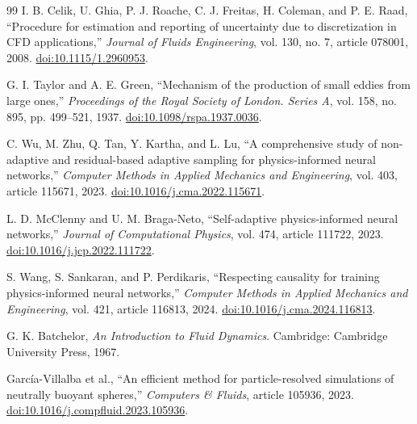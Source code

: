\begin{thebibliography}{99}
I. B. Celik, U. Ghia, P. J. Roache, C. J. Freitas, H. Coleman, and
P. E. Raad, ``Procedure for estimation and reporting of uncertainty due
to discretization in CFD applications,'' \emph{Journal of Fluids
Engineering}, vol. 130, no. 7, article 078001, 2008.
\href{https://doi.org/10.1115/1.2960953}{doi:10.1115/1.2960953}.

G. I. Taylor and A. E. Green, ``Mechanism of the production of small
eddies from large ones,'' \emph{Proceedings of the Royal Society of
London. Series A}, vol. 158, no. 895, pp. 499--521, 1937.
\href{https://doi.org/10.1098/rspa.1937.0036}{doi:10.1098/rspa.1937.0036}.

C. Wu, M. Zhu, Q. Tan, Y. Kartha, and L. Lu, ``A comprehensive study of
non-adaptive and residual-based adaptive sampling for physics-informed
neural networks,'' \emph{Computer Methods in Applied Mechanics and
Engineering}, vol. 403, article 115671, 2023.
\href{https://doi.org/10.1016/j.cma.2022.115671}{doi:10.1016/j.cma.2022.115671}.

L. D. McClenny and U. M. Braga-Neto, ``Self-adaptive physics-informed
neural networks,'' \emph{Journal of Computational Physics}, vol. 474,
article 111722, 2023.
\href{https://doi.org/10.1016/j.jcp.2022.111722}{doi:10.1016/j.jcp.2022.111722}.

S. Wang, S. Sankaran, and P. Perdikaris, ``Respecting causality for
training physics-informed neural networks,'' \emph{Computer Methods in
Applied Mechanics and Engineering}, vol. 421, article 116813, 2024.
\href{https://doi.org/10.1016/j.cma.2024.116813}{doi:10.1016/j.cma.2024.116813}.

G. K. Batchelor, \emph{An Introduction to Fluid Dynamics}.
Cambridge: Cambridge University Press, 1967.

Garc\'ia-Villalba et al.,
``An efficient method for particle-resolved simulations of neutrally
buoyant spheres,'' \emph{Computers \& Fluids}, article 105936, 2023.
\href{https://doi.org/10.1016/j.compfluid.2023.105936}{doi:10.1016/j.compfluid.2023.105936}.

\end{thebibliography}
